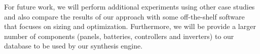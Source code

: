 \documentclass[10pt,conference]{IEEEtran}
\begin{document}
\begin{table}
\begin{scriptsize}
\begin{tabular}{|c|c|c|}
\hline
\hline
\end{tabular}
\end{scriptsize}
\end{table}

For future work, we will perform additional experiments using other case studies and also compare the results of our approach with some off-the-shelf software that focuses on sizing and optimization. 
Furthermore, we will be provide a larger number of components (panels, batteries, controllers and inverters) to our database to be used by our synthesis engine.
%
{}

\vspace{12pt}
\end{document}
